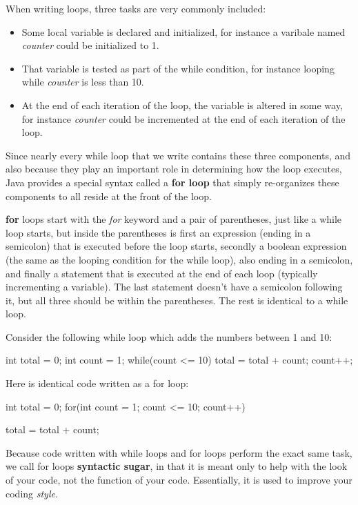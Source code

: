 When writing loops, three tasks are very commonly included: 
\begin{itemize}
\item Some local variable is declared and initialized, for instance a varibale named \textit{counter} could be initialized to 1. 
\item That variable is tested as part of the while condition, for instance looping while \textit{counter} is less than 10. 
\item At the end of each iteration of the loop, the variable is altered in some way, for instance \textit{counter} could be incremented at the end of each iteration of the loop. 
\end{itemize}

Since nearly every while loop that we write contains these three components, and also because they play an important role in determining how the loop executes, Java provides a special syntax called a \textbf{for loop} that simply re-organizes these components to all reside at the front of the loop. 

\textbf{for} loops start with the \textit{for} keyword and a pair of parentheses, just like a while loop starts, but inside the parentheses is first an expression (ending in a semicolon) that is executed before the loop starts, secondly a boolean expression (the same as the looping condition for the while loop), also ending in a semicolon, and finally a statement that is executed at the end of each loop (typically incrementing a variable). The last statement doesn't have a semicolon following it, but all three should be within the parentheses. The rest is identical to a while loop. 

\begin{exa}
Consider the following while loop which adds the numbers between 1 and 10:


\begin{code}
int total = 0;
int count = 1;
while(count <= 10) {
  total = total + count;
  count++;
}
\end{code}

Here is identical code written as a for loop:


\begin{code}

int total = 0;
for(int count = 1; count <= 10; count++) {

  total = total + count;
}
\end{code}
\end{exa}

Because code written with while loops and for loops perform the exact same task, we call for loops \textbf{syntactic sugar}, in that it is meant only to help with the look of your code, not the function of your code. Essentially, it is used to improve your coding \textit{style}.

